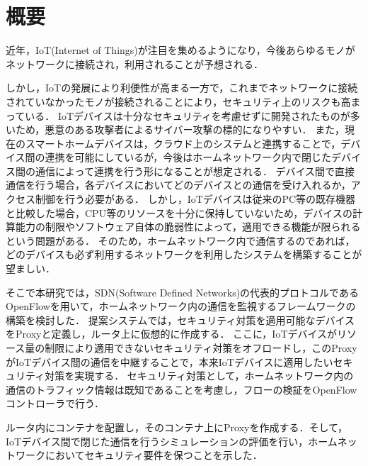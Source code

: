 \documentclass[Japanese]{dicomopapers}
\begin{document}
\section{概要}
近年，IoT(Internet of Things)が注目を集めるようになり，今後あらゆるモノがネットワークに接続され，利用されることが予想される．\par
しかし，IoTの発展により利便性が高まる一方で，これまでネットワークに接続されていなかったモノが接続されることにより，セキュリティ上のリスクも高まっている．
IoTデバイスは十分なセキュリティを考慮せずに開発されたものが多いため，悪意のある攻撃者によるサイバー攻撃の標的になりやすい．
また，現在のスマートホームデバイスは，クラウド上のシステムと連携することで，デバイス間の連携を可能にしているが，今後はホームネットワーク内で閉じたデバイス間の通信によって連携を行う形になることが想定される．
デバイス間で直接通信を行う場合，各デバイスにおいてどのデバイスとの通信を受け入れるか，アクセス制御を行う必要がある．
しかし，IoTデバイスは従来のPC等の既存機器と比較した場合，CPU等のリソースを十分に保持していないため，デバイスの計算能力の制限やソフトウェア自体の脆弱性によって，適用できる機能が限られるという問題がある．
そのため，ホームネットワーク内で通信するのであれば，どのデバイスも必ず利用するネットワークを利用したシステムを構築することが望ましい．\par
そこで本研究では，SDN(Software Defined Networks)の代表的プロトコルであるOpenFlowを用いて，ホームネットワーク内の通信を監視するフレームワークの構築を検討した．
提案システムでは，セキュリティ対策を適用可能なデバイスをProxyと定義し，ルータ上に仮想的に作成する．
ここに，IoTデバイスがリソース量の制限により適用できないセキュリティ対策をオフロードし，このProxyがIoTデバイス間の通信を中継することで，本来IoTデバイスに適用したいセキュリティ対策を実現する．
セキュリティ対策として，ホームネットワーク内の通信のトラフィック情報は既知であることを考慮し，フローの検証をOpenFlowコントローラで行う．\par
ルータ内にコンテナを配置し，そのコンテナ上にProxyを作成する．そして，IoTデバイス間で閉じた通信を行うシミュレーションの評価を行い，ホームネットワークにおいてセキュリティ要件を保つことを示した．
\end{document}
